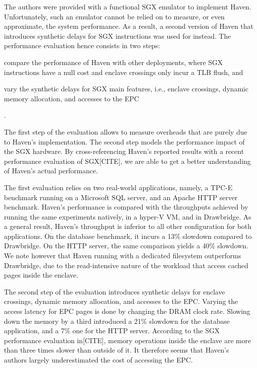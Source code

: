 The authors were provided with a functional SGX emulator to implement Haven.
Unfortunately, such an emulator cannot be relied on to measure, or even approximate, the system performance.
As a result, a second version of Haven that introduces synthetic delays for SGX instructions was used for instead.
The performance evaluation hence consists in two steps:
\begin{enumerate*}
	\item compare the performance of Haven with other deployments, where SGX instructions have a null cost and enclave crossings only incur a TLB flush, and
	\item vary the synthetic delays for SGX main features, i.e., enclave crossings, dynamic memory allocation, and accesses to the EPC
\end{enumerate*}.

The first step of the evaluation allows to measure overheads that are purely due to Haven's implementation.
The second step models the performance impact of the SGX hardware.
By cross-referencing Haven's reported results with a recent performance evaluation of SGX[CITE], we are able to get a better understanding of Haven's actual performance.

The first evaluation relies on two real-world applications, namely, a TPC-E benchmark running on a Microsoft SQL server, and an Apache HTTP server benchmark.
Haven's performance is compared with the throughputs achieved by running the same experiments natively, in a hyper-V VM, and in Drawbridge.
As a general result, Haven's throughput is inferior to all other configuration for both applications.
On the database benchmark, it incurs a 13\% slowdown compared to Drawbridge.
On the HTTP server, the same comparison yields a 40\% slowdown.
We note however that Haven running with a dedicated filesystem outperforms Drawbridge, due to the read-intensive nature of the workload that access cached pages inside the enclave.

The second step of the evaluation introduces synthetic delays for enclave crossings, dynamic memory allocation, and accesses to the EPC.
Varying the access latency for EPC pages is done by changing the DRAM clock rate.
Slowing down the memory by a third introduced a 21\% slowdown for the database application, and a 7\% one for the HTTP server.
According to the SGX performance evaluation in[CITE], memory operations inside the enclave are more than three times slower than outside of it.
It therefore seems that Haven's authors largely underestimated the cost of accessing the EPC.

